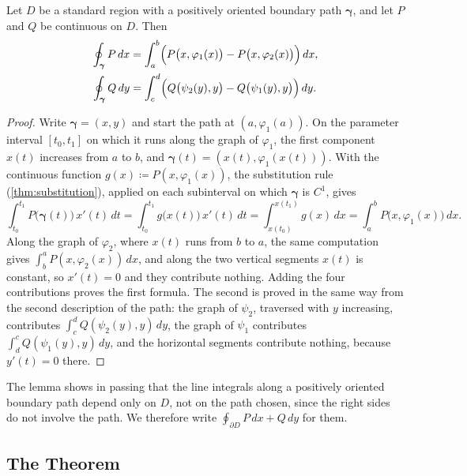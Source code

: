 \begin{lemma}
\label{lem:green-boundary}
Let $D$ be a standard region with a positively oriented boundary path $\boldsymbol\gamma$, and let $P$ and $Q$ be continuous on $D$. Then
\[
\begin{aligned}
\oint_{\boldsymbol\gamma}P\,dx&=\int_a^b\Bigl(P\bigl(x,\varphi_1(x)\bigr)-P\bigl(x,\varphi_2(x)\bigr)\Bigr)\,dx ,\\
\oint_{\boldsymbol\gamma}Q\,dy&=\int_c^d\Bigl(Q\bigl(\psi_2(y),y\bigr)-Q\bigl(\psi_1(y),y\bigr)\Bigr)\,dy .
\end{aligned}
\]
\end{lemma}

\begin{proof}
Write $\boldsymbol\gamma=(x,y)$ and start the path at $(a,\varphi_1(a))$. On the parameter interval $[t_0,t_1]$ on which it runs along the graph of $\varphi_1$, the first component $x(t)$ increases from $a$ to $b$, and $\boldsymbol\gamma(t)=(x(t),\varphi_1(x(t)))$. With the continuous function $g(x)\coloneqq P(x,\varphi_1(x))$, the substitution rule (\cref{thm:substitution}), applied on each subinterval on which $\boldsymbol\gamma$ is $C^1$, gives
\[
\int_{t_0}^{t_1}P\bigl(\boldsymbol\gamma(t)\bigr)\,x'(t)\,dt=\int_{t_0}^{t_1}g\bigl(x(t)\bigr)\,x'(t)\,dt=\int_{x(t_0)}^{x(t_1)}g(x)\,dx=\int_a^bP\bigl(x,\varphi_1(x)\bigr)\,dx .
\]
Along the graph of $\varphi_2$, where $x(t)$ runs from $b$ to $a$, the same computation gives $\int_b^aP(x,\varphi_2(x))\,dx$, and along the two vertical segments $x(t)$ is constant, so $x'(t)=0$ and they contribute nothing. Adding the four contributions proves the first formula. The second is proved in the same way from the second description of the path: the graph of $\psi_2$, traversed with $y$ increasing, contributes $\int_c^dQ(\psi_2(y),y)\,dy$, the graph of $\psi_1$ contributes $\int_d^cQ(\psi_1(y),y)\,dy$, and the horizontal segments contribute nothing, because $y'(t)=0$ there.
\end{proof}

The lemma shows in passing that the line integrals along a positively oriented boundary path depend only on $D$, not on the path chosen, since the right sides do not involve the path. We therefore write $\oint_{\partial D}P\,dx+Q\,dy$ for them.

\subsection{The Theorem}

